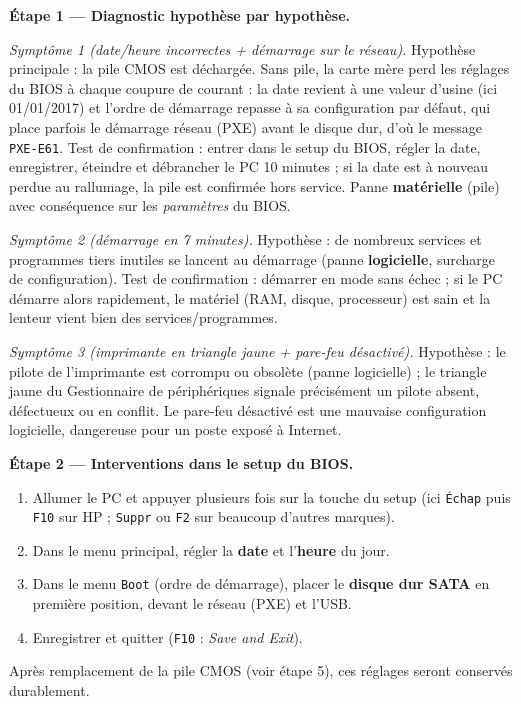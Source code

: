 \documentclass[11pt]{article}
\newcommand{\cle}[1]{{\popxbold\color{popdark}#1}}
\begin{document}
\begin{exoresolu}
\textbf{Étape 1 — Diagnostic hypothèse par hypothèse.}

\emph{Symptôme 1 (date/heure incorrectes + démarrage sur le réseau).} Hypothèse principale : la \cle{pile CMOS} est déchargée. Sans pile, la carte mère perd les réglages du BIOS à chaque coupure de courant : la date revient à une valeur d'usine (ici 01/01/2017) et l'ordre de démarrage repasse à sa configuration par défaut, qui place parfois le démarrage réseau (PXE) avant le disque dur, d'où le message \texttt{PXE-E61}. Test de confirmation : entrer dans le setup du BIOS, régler la date, enregistrer, éteindre et débrancher le PC 10 minutes ; si la date est à nouveau perdue au rallumage, la pile est confirmée hors service. Panne \textbf{matérielle} (pile) avec conséquence sur les \emph{paramètres} du BIOS.

\emph{Symptôme 2 (démarrage en 7 minutes).} Hypothèse : de nombreux services et programmes tiers inutiles se lancent au démarrage (panne \textbf{logicielle}, surcharge de configuration). Test de confirmation : démarrer en \cle{mode sans échec} ; si le PC démarre alors rapidement, le matériel (RAM, disque, processeur) est sain et la lenteur vient bien des services/programmes.

\emph{Symptôme 3 (imprimante en triangle jaune + pare-feu désactivé).} Hypothèse : le \cle{pilote} de l'imprimante est corrompu ou obsolète (panne logicielle) ; le triangle jaune du Gestionnaire de périphériques signale précisément un pilote absent, défectueux ou en conflit. Le pare-feu désactivé est une mauvaise configuration logicielle, dangereuse pour un poste exposé à Internet.

\tcblower

\textbf{Étape 2 — Interventions dans le setup du BIOS.}
\begin{enumerate}
\item Allumer le PC et appuyer plusieurs fois sur la touche du setup (ici \texttt{Échap} puis \texttt{F10} sur HP ; \texttt{Suppr} ou \texttt{F2} sur beaucoup d'autres marques).
\item Dans le menu principal, régler la \textbf{date} et l'\textbf{heure} du jour.
\item Dans le menu \texttt{Boot} (ordre de démarrage), placer le \textbf{disque dur SATA} en première position, devant le réseau (PXE) et l'USB.
\item Enregistrer et quitter (\texttt{F10} : \emph{Save and Exit}).
\end{enumerate}
Après remplacement de la pile CMOS (voir étape 5), ces réglages seront conservés durablement.


\end{exoresolu}
\end{document}

